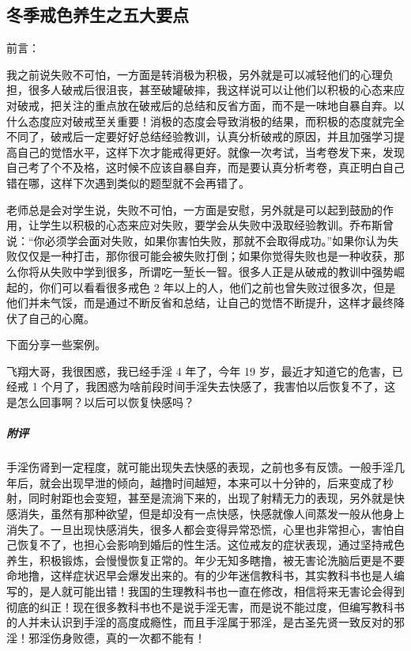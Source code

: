 \subsection{冬季戒色养生之五大要点}


前言：

我之前说失败不可怕，一方面是转消极为积极，另外就是可以减轻他们的心理负担，很多人破戒后很沮丧，甚至破罐破摔，我这样说可以让他们以积极的心态来应对破戒，把关注的重点放在破戒后的总结和反省方面，而不是一味地自暴自弃。以什么态度应对破戒至关重要！消极的态度会导致消极的结果，而积极的态度就完全不同了，破戒后一定要好好总结经验教训，认真分析破戒的原因，并且加强学习提高自己的觉悟水平，这样下次才能戒得更好。就像一次考试，当考卷发下来，发现自己考了个不及格，这时候不应该自暴自弃，而是要认真分析考卷，真正明白自己错在哪，这样下次遇到类似的题型就不会再错了。

老师总是会对学生说，失败不可怕，一方面是安慰，另外就是可以起到鼓励的作用，让学生以积极的心态来应对失败，要学会从失败中汲取经验教训。乔布斯曾说：“你必须学会面对失败，如果你害怕失败，那就不会取得成功。”如果你认为失败仅仅是一种打击，那你很可能会被失败打倒；如果你觉得失败也是一种收获，那么你将从失败中学到很多，所谓吃一堑长一智。很多人正是从破戒的教训中强势崛起的，你们可以看看很多戒色 2 年以上的人，他们之前也曾失败过很多次，但是他们并未气馁，而是通过不断反省和总结，让自己的觉悟不断提升，这样才最终降伏了自己的心魔。

下面分享一些案例。

\begin{case}
    飞翔大哥，我很困惑，我已经手淫 4 年了，今年 19 岁，最近才知道它的危害，已经戒 1 个月了，我困惑为啥前段时间手淫失去快感了，我害怕以后恢复不了，这是怎么回事啊？以后可以恢复快感吗？
    \subparagraph{附评} 手淫伤肾到一定程度，就可能出现失去快感的表现，之前也多有反馈。一般手淫几年后，就会出现早泄的倾向，越撸时间越短，本来可以十分钟的，后来变成了秒射，同时射距也会变短，甚至是流淌下来的，出现了射精无力的表现，另外就是快感消失，虽然有那种欲望，但是却没有一点快感，快感就像人间蒸发一般从他身上消失了。一旦出现快感消失，很多人都会变得异常恐慌，心里也非常担心，害怕自己恢复不了，也担心会影响到婚后的性生活。这位戒友的症状表现，通过坚持戒色养生，积极锻炼，会慢慢恢复正常的。年少无知多瞎撸，被无害论洗脑后更是不要命地撸，这样症状迟早会爆发出来的。有的少年迷信教科书，其实教科书也是人编写的，是人就可能出错！我国的生理教科书也一直在修改，相信将来无害论会得到彻底的纠正！现在很多教科书也不是说手淫无害，而是说不能过度，但编写教科书的人并未认识到手淫的高度成瘾性，而且手淫属于邪淫，是古圣先贤一致反对的邪淫！邪淫伤身败德，真的一次都不能有！
\end{case}

